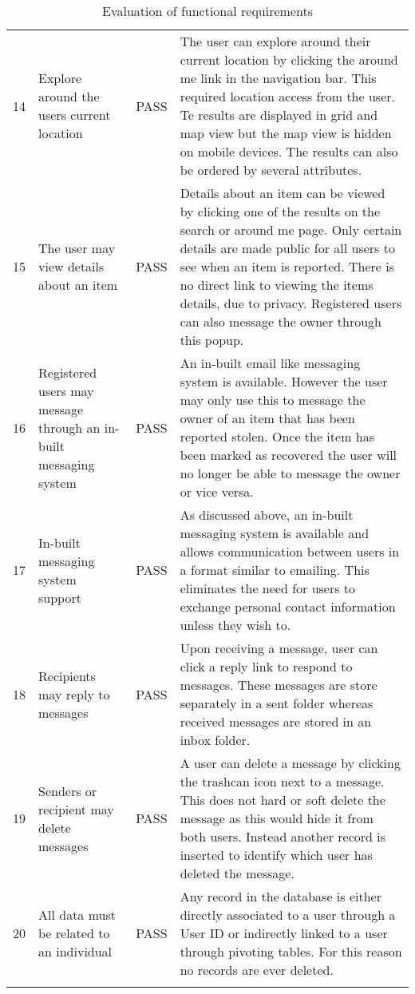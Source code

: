 \begin{longtable}{@{}p{}p{}p{}p{}@{}}
	14 & Explore around the users current location & \textcolor{PassGreen}{PASS} & The user can explore around their current location by clicking the around me link in the navigation bar. This required location access from the user. Te results are displayed in grid and map view but the map view is hidden on mobile devices. The results can also be ordered by several attributes. \\
	
	15 & The user may view details about an item & \textcolor{PassGreen}{PASS} & Details about an item can be viewed by clicking one of the results on the search or around me page. Only certain details are made public for all users to see when an item is reported. There is no direct link to viewing the items details, due to privacy. Registered users can also message the owner through this popup. \\
	
	16 & Registered users may message through an in-built messaging system & \textcolor{PassGreen}{PASS} & An in-built email like messaging system is available. However the user may only use this to message the owner of an item that has been reported stolen. Once the item has been marked as recovered the user will no longer be able to message the owner or vice versa. \\
	
	17 & In-built messaging system support & \textcolor{PassGreen}{PASS} & As discussed above, an in-built messaging system is available and allows communication between users in a format similar to emailing. This eliminates the need for users to exchange personal contact information unless they wish to. \\
	
	18 & Recipients may reply to messages & \textcolor{PassGreen}{PASS} & Upon receiving a message, user can click a reply link to respond to messages. These messages are store separately in a sent folder whereas received messages are stored in an inbox folder. \\
	
	19 & Senders or recipient may delete messages & \textcolor{PassGreen}{PASS} & A user can delete a message by clicking the trashcan icon next to a message. This does not hard or soft delete the message as this would hide it from both users. Instead another record is inserted to identify which user has deleted the message. \\
	
	20 & All data must be related to an individual & \textcolor{PassGreen}{PASS} & Any record in the database is either directly associated to a user through a User ID or indirectly linked to a user through pivoting tables. For this reason no records are ever deleted. \\ \bottomrule

	\caption{Evaluation of functional requirements}
	\label{table:Functional_Evaluation}
\end{longtable}


